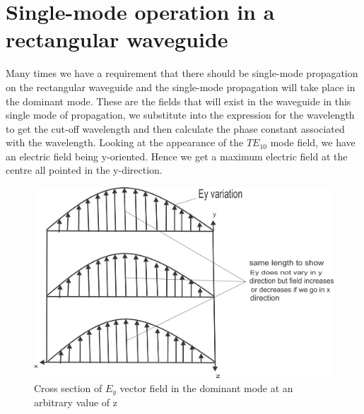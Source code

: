 \section{Single-mode operation in a rectangular waveguide}
 Many times we have a requirement that there should be single-mode propagation on the rectangular waveguide and the single-mode propagation will take place in the dominant mode. These are the fields that will exist in the waveguide in this single mode of propagation, we substitute into the expression for the wavelength to get the cut-off wavelength and then calculate the phase constant associated with the wavelength. Looking at the appearance of the $TE_{10}$ mode field, we have an electric field being y-oriented. Hence we get a maximum electric field at the centre all pointed in the y-direction.
\begin{figure}[h]
\centering
\includegraphics[width=1\linewidth]{./graphics/group39-1}
\caption{Cross section of $E_y$ vector field in the dominant mode at an arbitrary value of z}
\label{fig:lec39-1}
\end{figure}

